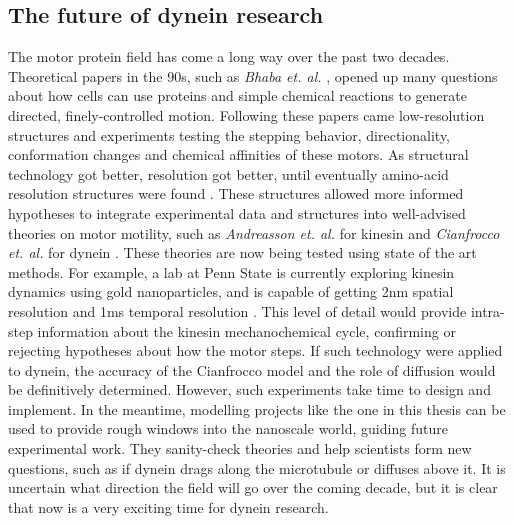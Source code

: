 \documentclass[
11pt, %
english, %
singlespacing, %
headsepline, %
chapterinoneline, %
]{MastersDoctoralThesis} %
\begin{document}
\subsection{The future of dynein research}
The motor protein field has come a long way over the past two decades. Theoretical papers in the 90s, such as \textit{Bhaba et. al.} \cite{bhabha-paper},  opened up many questions about how cells can use proteins and simple chemical reactions to generate directed, finely-controlled motion. Following these papers came low-resolution structures and experiments testing the stepping behavior, directionality, conformation changes and chemical affinities of these motors. As structural technology got better, resolution got better, until eventually amino-acid resolution structures were found \cite{schmidt-carter}. These structures allowed more informed hypotheses to integrate experimental data and structures into well-advised theories on motor motility, such as \textit{Andreasson et. al.} for kinesin \cite{kinesin-cycle} and \textit{Cianfrocco et. al.} for dynein \cite{cianfroccoreview}. These theories are now being tested using state of the art methods. For example, a lab at Penn State is currently exploring kinesin dynamics using gold nanoparticles, and is capable of getting 2nm spatial resolution and 1ms temporal resolution \cite{kinesin-gold-nanoparticle}. This level of detail would provide intra-step information about the kinesin mechanochemical cycle, confirming or rejecting hypotheses about how the motor steps. If such technology were applied to dynein, the accuracy of the Cianfrocco model and the role of diffusion would be definitively determined. However, such experiments take time to design and implement. In the meantime, modelling projects like the one in this thesis can be used to provide rough windows into the nanoscale world, guiding future experimental work. They sanity-check theories and help scientists form new questions, such as if dynein drags along the microtubule or diffuses above it. It is uncertain what direction the field will go over the coming decade, but it is clear that now is a very exciting time for dynein research.\\


\appendix %
\end{document}
